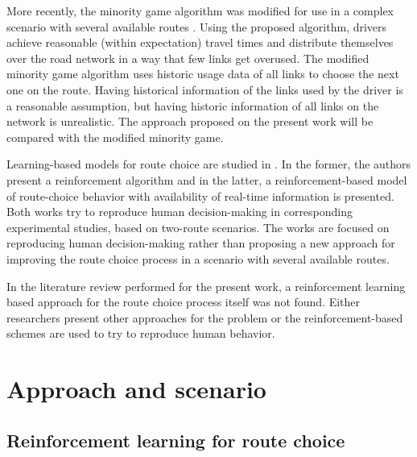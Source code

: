 \documentclass{RITA}
\begin{document}
More recently, the minority game algorithm was modified for use in a complex scenario with several available routes \cite{Galib&Moser2011}. Using the proposed algorithm, drivers achieve reasonable (within expectation) travel times and distribute themselves over the road network in a way that few links get overused. The modified minority game algorithm uses historic usage data of all links to choose the next one on the route. Having historical information of the links used by the driver is a reasonable assumption, but having historic information of all links on the network is unrealistic. The approach proposed on the present work will be compared with the modified minority game. 


Learning-based models for route choice are studied in \cite{Chmura&Pitz2007,Ben-Elia&Shiftan2010}. In the former, the authors present a reinforcement algorithm and in the latter, a reinforcement-based model of route-choice behavior with availability of real-time information is presented. Both works try to reproduce human decision-making in corresponding experimental studies, based on two-route scenarios. The works are focused on reproducing human decision-making rather than proposing a new approach for improving the route choice process in a scenario with several available routes.

In the literature review performed for the present work, a reinforcement learning based approach for the route choice process itself was not found. Either researchers present other approaches for the problem or the reinforcement-based schemes are used to try to reproduce human behavior.

\section{Approach and scenario}
\label{sec:proposal}

\subsection{Reinforcement learning for route choice}
\end{document}
